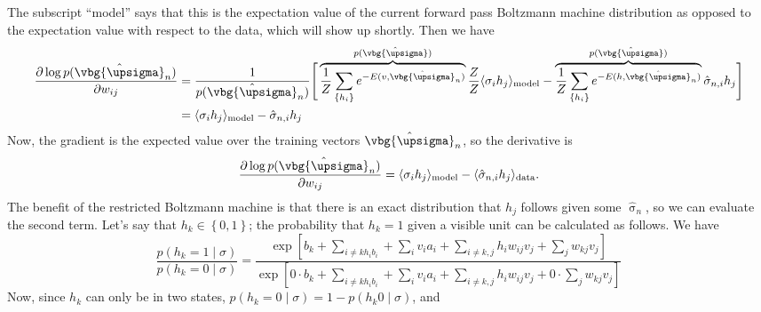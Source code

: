 \documentclass{article}
\begin{document}
The subscript ``model'' says that this is the expectation value of the 
current forward pass Boltzmann machine distribution as opposed to the 
expectation value with respect to the data, which will show up shortly. 
Then we have 
\begin{align*}
	\frac{\partial \log p(\hat{\vbg{\upsigma}}_n)}{\partial w_{ij}}
		&= \frac{1}{p(\hat{\vbg{\upsigma}}_n)} \Bigg[
			\overbrace{\frac{1}{Z}\sum_{\left\{h_i\right\}} e^{-E(v,\hat{\vbg{\upsigma}}_n)}}^{p(\hat{\vbg{\upsigma}})}
			\frac{Z}{Z} \langle \sigma_i h_j \rangle_{\text{model}}
			- \overbrace{\frac{1}{Z} \sum_{\left\{h_i\right\}} 
			e^{-E(h, \hat{\vbg{\upsigma}}_n)}}^{p(\hat{\vbg{\upsigma}})}
			 \hat{\sigma}_{n,i} h_j
			\Bigg]\\
		&= \langle \sigma_i h_j \rangle_{\text{model}} 
			- \hat{\sigma}_{n,i} h_j
\end{align*}
Now, the gradient is the expected value over the training vectors $ \hat{\vbg{\upsigma}}_n $, 
so the derivative is
\begin{equation*}
	\frac{\partial \log p(\hat{\vbg{\upsigma}}_n)}{\partial w_{ij}}
	= \langle \sigma_i h_j \rangle_{\text{model}} 
		- \langle\hat{\sigma}_{n,i} h_j\rangle_{\text{data}}.
\end{equation*}
The benefit of the restricted Boltzmann machine is that there is an exact 
distribution that $ h_j $ follows given some $ \hat{\upsigma}_n $, so we 
can evaluate the second term. Let's say that $ h_k\in\left\{0,1\right\} $; 
the probability that $ h_k = 1$ given a visible unit can be calculated as follows. 
We have 
\begin{equation*}
	\frac{p(h_k=1\mid \sigma)}{p(h_k=0\mid \sigma)}
		= \frac{
			\exp\left[b_k + \sum_{i\neq k h_i b_i} + \sum_i v_i a_i + \sum_{i\neq k, j}h_i w_{ij} v_j
				+ \sum_j w_{kj} v_j\right]
		}{
			\exp\left[0\cdot b_k + \sum_{i\neq k h_i b_i} + \sum_i v_i a_i + \sum_{i\neq k, j}h_i w_{ij} v_j
				+ 0\cdot \sum_j w_{kj} v_j\right]
		}
\end{equation*}
Now, since $ h_k $ can only be in two states, $ p(h_k = 0\mid \sigma) = 1- p(h_k 0\mid\sigma)$, and 
\end{document}
